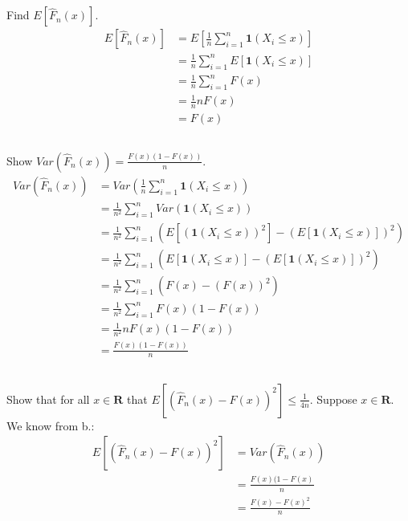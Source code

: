 \section{}

\subsection{}

Find $E[\hat{F}_n(x)]$.
\begin{align*}
    E[\hat{F}_n(x)] &= E[\frac{1}{n} \sum_{i=1}^n \mathbf{1}(X_i \leq x)] \\
	&= \frac{1}{n} \sum_{i=1}^n E[\mathbf{1}(X_i \leq x)] \\
	&= \frac{1}{n} \sum_{i=1}^n F(x) \tag*{$X_i$ is i.i.d for $i \in [1,n]$} \\
	&= \frac{1}{n} n F(x) \\
	&= F(x)
\end{align*}

\subsection{}

Show $Var(\hat{F}_n(x)) = \frac{F(x)(1 - F(x))}{n}$.
\begin{align*}
    Var(\hat{F}_n(x)) &= Var(\frac{1}{n} \sum_{i=1}^n \mathbf{1} (X_i \leq x)) \\
	&= \frac{1}{n^2} \sum_{i=1}^n Var(\mathbf{1}(X_i \leq x)) \\
	&= \frac{1}{n^2} \sum_{i=1}^n (E[(\mathbf{1}(X_i \leq x))^2] - (E[\mathbf{1}(X_i \leq x)])^2) \\
	&= \frac{1}{n^2} \sum_{i=1}^n (E[\mathbf{1}(X_i \leq x)] - (E[\mathbf{1}(X_i \leq x)])^2) \\
	&= \frac{1}{n^2} \sum_{i=1}^n (F(x) - (F(x))^2) \tag*{$X_i$ is i.i.d for $i \in [1,n]$} \\
	&= \frac{1}{n^2} \sum_{i=1}^n F(x)(1 - F(x)) \\
	&= \frac{1}{n^2} n F(x)(1 - F(x)) \\
	&= \frac{F(x)(1 - F(x))}{n}
\end{align*}

\subsection{}

Show that for all $x \in \mathbf{R}$ that $E[(\hat{F}_n(x) - F(x))^2] \leq \frac{1}{4n}$. Suppose $x \in \mathbf{R}$.
We know from b.:
\begin{align*}
    E[(\hat{F}_n(x) - F(x))^2] &= Var(\hat{F}_n(x)) \\
	&= \frac{F(x)(1-F(x)}{n} \\
	&= \frac{F(x)-F(x)^2}{n}
\end{align*}

